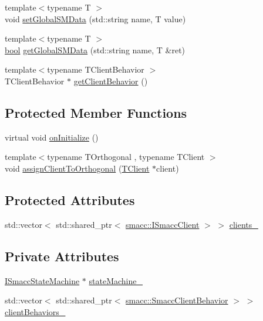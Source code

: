\begin{DoxyCompactItemize}
\item 
{\footnotesize template$<$typename T $>$ }\\void \hyperlink{classsmacc_1_1ISmaccOrthogonal_a2b5b15907fa6c7c6882717246f0633ab}{set\+Global\+S\+M\+Data} (std\+::string name, T value)
\item 
{\footnotesize template$<$typename T $>$ }\\\hyperlink{classbool}{bool} \hyperlink{classsmacc_1_1ISmaccOrthogonal_aa763280bc6980811744c8e8f11b2dcd0}{get\+Global\+S\+M\+Data} (std\+::string name, T \&ret)
\item 
{\footnotesize template$<$typename T\+Client\+Behavior $>$ }\\T\+Client\+Behavior $\ast$ \hyperlink{classsmacc_1_1ISmaccOrthogonal_a463bb235217511954feb4133394c4c61}{get\+Client\+Behavior} ()
\end{DoxyCompactItemize}
\subsection*{Protected Member Functions}
\begin{DoxyCompactItemize}
\item 
virtual void \hyperlink{classsmacc_1_1ISmaccOrthogonal_a6bb31c620cb64dd7b8417f8705c79c7a}{on\+Initialize} ()
\item 
{\footnotesize template$<$typename T\+Orthogonal , typename T\+Client $>$ }\\void \hyperlink{classsmacc_1_1ISmaccOrthogonal_a2241e4d2018f5bd74bd1925f19791606}{assign\+Client\+To\+Orthogonal} (\hyperlink{classTClient}{T\+Client} $\ast$client)
\end{DoxyCompactItemize}
\subsection*{Protected Attributes}
\begin{DoxyCompactItemize}
\item 
std\+::vector$<$ std\+::shared\+\_\+ptr$<$ \hyperlink{classsmacc_1_1ISmaccClient}{smacc\+::\+I\+Smacc\+Client} $>$ $>$ \hyperlink{classsmacc_1_1ISmaccOrthogonal_a0f270e9c8c126198f6bce542ab4e04ba}{clients\+\_\+}
\end{DoxyCompactItemize}
\subsection*{Private Attributes}
\begin{DoxyCompactItemize}
\item 
\hyperlink{classsmacc_1_1ISmaccStateMachine}{I\+Smacc\+State\+Machine} $\ast$ \hyperlink{classsmacc_1_1ISmaccOrthogonal_a418b2e094a65013444ec1fca7e94f28d}{state\+Machine\+\_\+}
\item 
std\+::vector$<$ std\+::shared\+\_\+ptr$<$ \hyperlink{classsmacc_1_1SmaccClientBehavior}{smacc\+::\+Smacc\+Client\+Behavior} $>$ $>$ \hyperlink{classsmacc_1_1ISmaccOrthogonal_ad9e6c0f9055e51a61c9728ac7117dae2}{client\+Behaviors\+\_\+}
\end{DoxyCompactItemize}


